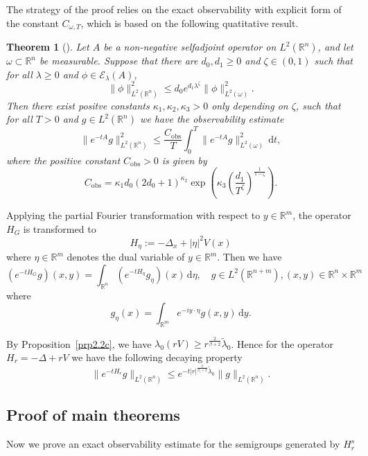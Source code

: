 \documentclass{article}
\numberwithin{equation}{section}
\renewcommand{\d}{\,\mathrm{d}}
\newcommand\R{\ensuremath{\mathbb{R}}}
\newtheorem{theorem}{Theorem}[section]
\numberwithin{equation}{section}
\theoremstyle{definition}
\begin{document}
The strategy of the proof relies on the exact observability with explicit form of the constant $C_{\omega,T}$, which is based on the following quatitative result.
\begin{theorem}[{\cite[Theorem 2.8]{nakic2020sharp}}]\label{thm2.1d}
	Let $A$ be a non-negative selfadjoint operator on $L^2\left( \R^{n} \right) $, and let $\omega \subset \R^{n}$ be measurable. Suppose that there are $d_0,d_1\ge 0$ and $\zeta \in (0,1)$ such that for all $\lambda \ge 0$ and $\phi \in \mathcal{E}_\lambda(A)$,
	\begin{equation}\label{2.1c}
	\|\phi\|^2_{L^2(\R^{n})}\le d_0 e^{d_1\lambda^{\zeta}}\|\phi\|^2_{L^2(\omega)}.
	\end{equation}
	Then there exist positve constants $\kappa_1,\kappa_2,\kappa_3>0$ only depending on $\zeta$, such that for all $T>0$ and $g \in L^2(\R^{n})$ we have the observability estimate
	\[
	\|e^{-tA}g\|^2_{L^2(\R^{n})}\le \frac{C_{\mathrm{obs}}}{T}\int_0^{T}\|e^{-tA}g\|^2_{L^2(\omega)}\d t,
	\] 
	where the positive constant $C_{\mathrm{obs}}>0$ is given by
	\begin{equation}\label{2.2c}
		C_{\mathrm{obs}}=\kappa_1 d_0(2d_0+1)^{\kappa_2}\exp\left( \kappa_3\left( \frac{d_1}{T^{\zeta}} \right) ^{\frac{1}{1-\zeta}} \right).
	\end{equation}
\end{theorem}
	Applying the partial Fourier transformation with respect to $y\in \R^{m}$, the operator $H_{G}$ is transformed to
	\[
	H_\eta:= -\Delta_x+|\eta |^{2}V(x)
	\] 
	where $\eta \in \R^{m}$ denotes the dual variable of $y\in \R^{m}$. Then we have
	\begin{equation}\label{2.2b}
		(e^{-tH_{G}} g)(x,y) = \int_{\R^{n}}\left(e^{-t H_\eta}g_\eta \right)(x)\d \eta,\quad g\in L^2\left( \R^{n+m} \right), (x,y) \in \R^{n}\times \R^{m} 
	\end{equation}
	where
	\[
	g_{\eta}(x)=\int_{\R^{m}}e^{-iy\cdot \eta}g(x ,y)\d y.
	\]

By Proposition~\ref{prp2.2c}, we have $\lambda_0(rV)\ge r^{\frac{2}{ \beta+2}}\widetilde{\lambda}_0$. Hence for the operator $H_r=-\Delta+rV$ we have the following decaying property
\begin{equation}\label{2.5c}
	\|e^{-t H_{r}}g\|_{L^2\left( \R^{n} \right) }\le e^{-t |r|^{\frac{2}{\beta_1+2}}\widetilde{\lambda}_0} \|g\|_{L^2(\R^{n})}.
\end{equation}


\subsection{Proof of main theorems}
Now we prove an exact observability estimate for the semigroups generated by $H_{r}^{s}$
\end{document}
